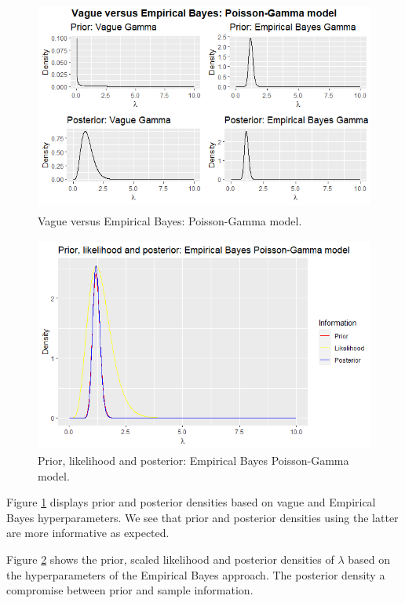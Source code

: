 \begin{figure}[!h]
	\includegraphics[width=340pt, height=200pt]{Chapters/chapter1/figures/PoisGam.png}
	\caption[List of figure caption goes here]{Vague versus Empirical Bayes: Poisson-Gamma model.}\label{fig12}
\end{figure}

\begin{figure}[!h]
	\includegraphics[width=340pt, height=200pt]{Chapters/chapter1/figures/PriorLikPost.png}
	\caption[List of figure caption goes here]{Prior, likelihood and posterior: Empirical Bayes Poisson-Gamma model.}\label{fig13}
\end{figure}

Figure \ref{fig12} displays prior and posterior densities based on vague and Empirical Bayes hyperparameters. We see that prior and posterior densities using the latter are more informative as expected.

Figure \ref{fig13} shows the prior, scaled likelihood and posterior densities of $\lambda$ based on the hyperparameters of the Empirical Bayes approach. The posterior density a compromise between prior and sample information. 

